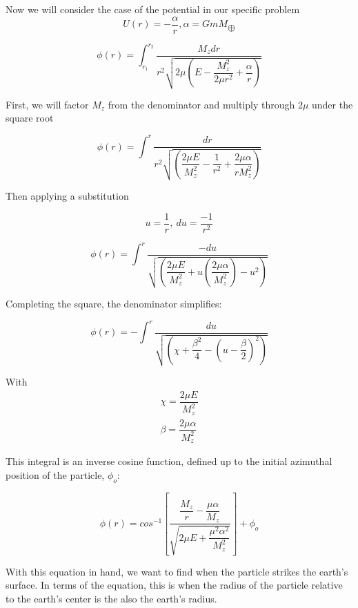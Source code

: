 \documentclass[%
 reprint,
 amsmath,amssymb,
 aps,
]{revtex4-1}
\begin{document}
Now we will consider the case of the potential in our specific problem 
\begin{equation*}
U(r) = -\dfrac{\alpha}{r}, \alpha = GmM_\bigoplus
\end{equation*}

\begin{equation*}
\phi(r) = \int_{r_1}^{r_2}\dfrac{M_z dr}{r^2\sqrt{2\mu\left(E-\dfrac{M_z^2}{2\mu r^2} + \dfrac{\alpha}{r}\right)}}
\end{equation*}

First, we will factor $M_z$ from the denominator and multiply through $2\mu$ under the square root

\begin{equation*}
\phi(r) = \int^{r}\dfrac{dr}{r^2\sqrt{\left(\dfrac{2\mu E}{M_z^2}-\dfrac{1}{r^2} + \dfrac{2\mu\alpha}{rM_z^2}\right)}}
\end{equation*}

Then applying a substitution 

\begin{equation*}
u = \dfrac{1}{r}, \ du = \dfrac{-1}{r^2}    
\end{equation*}

\begin{equation*}
\phi(r) = \int^{r}\dfrac{-du}{\sqrt{\left(\dfrac{2\mu E}{M_z^2} + u\left(\dfrac{2\mu\alpha}{M_z^2}\right)-u^2\right)}}
\end{equation*}

Completing the square, the denominator simplifies:

\begin{equation*}
\phi(r) = -\int^{r}\dfrac{du}{\sqrt{\left(\chi+\dfrac{\beta^2}{4}-(u-\dfrac{\beta}{2})^2\right)}}
\end{equation*}

With
\begin{eqnarray*}
\chi = \dfrac{2\mu E}{M_z^2}   \\
\beta = \dfrac{2\mu\alpha}{M_z^2}
\end{eqnarray*}

This integral is an inverse cosine function, defined up to the initial azimuthal position of the particle, $\phi_o$:

\begin{equation*}
\phi(r) = cos^{-1}\left[\dfrac{\dfrac{M_z}{r}-\dfrac{\mu\alpha}{M_z}}{\sqrt{2\mu E + \dfrac{\mu^2\alpha^2}{M_z^2}}}\right] + \phi_o   
\end{equation*}

With this equation in hand, we want to find when the particle strikes the earth's surface. In terms of the equation, this is when the radius of the particle relative to the earth's center is the also the earth's radius.
\end{document}
